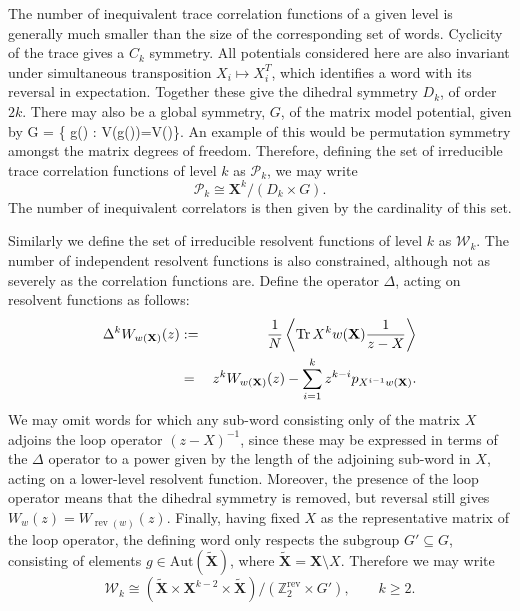 The number of inequivalent trace correlation functions of a given level is generally much smaller
than the size of the corresponding set of words. Cyclicity of the trace gives a $C_k$ symmetry. All
potentials considered here are also invariant under simultaneous transposition $X_i\mapsto X_i^T$,
which identifies a word with its reversal in expectation. Together these give the dihedral symmetry
$D_k$, of order $2k$. There may also be a global symmetry, $G$, of the matrix model potential,
given by
%
\beq
    \label{symmetry}
    G = \{ g\in {}() : V(g())=V()\}.
\eeq
%
An example of this would be permutation symmetry amongst the matrix degrees of freedom. Therefore,
defining the set of irreducible trace correlation functions of level $k$ as $\mathcal{P}_k$, we may
write
%
\begin{equation}
    \label{irreducibleTrace}
    \mathcal{P}_k \cong \mathbf{X}^k / (D_k \times G).
\end{equation}
%
The number of inequivalent correlators is then given by the cardinality of this set.

Similarly we define the set of irreducible resolvent functions of level $k$ as $\mathcal{W}_k$. The
number of independent resolvent functions is also constrained, although not as severely as the
correlation functions are. Define the operator $\Delta$, acting on resolvent functions as follows:
%
\begin{eqnarray}
    \label{delta}
    \Delta^k W_{w(\mathbf{X})}(z) & : = & \frac{1}{N} \left\langle \mathop{\mathrm{Tr}}\nolimits  X^k w(\mathbf{X}) \frac{1}{z-X}\right\rangle \\
                                  & =   & z^k W_{w(\mathbf{X})}(z) - \sum_{i=1}^k z^{k-i} p_{X^{i-1}w(\mathbf{X})}.
\end{eqnarray}
%
We may omit words for which any sub-word consisting only of the matrix $X$ adjoins the loop
operator $(z-X)^{-1}$, since these may be expressed in terms of the $\Delta$ operator to a power
given by the length of the adjoining sub-word in $X$, acting on a lower-level resolvent function.
Moreover, the presence of the loop operator means that the dihedral symmetry is removed, but
reversal still gives $W_w(z)=W_{\operatorname{rev}(w)}(z)$. Finally, having fixed $X$ as the
representative matrix of the loop operator, the defining word only respects the subgroup
$G'\subseteq G$, consisting of elements $g\in\mathrm{Aut}(\tilde{\mathbf{X}})$, where
$\tilde{\mathbf{X}}=\mathbf{X} \setminus X$. Therefore we may write
%
\begin{equation}
    \label{irreducibleResolvent}
    \mathcal{W}_k \cong (\tilde{\mathbf{X}} \times \mathbf{X}^{k-2} \times \tilde{\mathbf{X}})/(\mathbb{Z}_2^{\mathrm{rev}}\times G'),\qquad k\geq2.
\end{equation}

